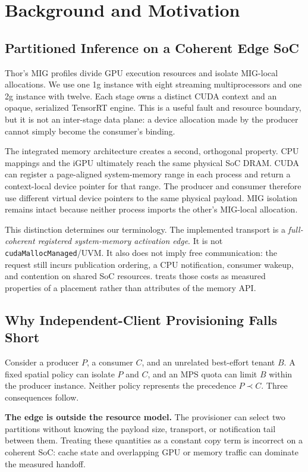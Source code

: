 \section{Background and Motivation}
\label{sec:background}

\subsection{Partitioned Inference on a Coherent Edge SoC}

Thor's MIG profiles divide GPU execution resources and isolate MIG-local
allocations.  We use one 1g instance with eight streaming multiprocessors and
one 2g instance with twelve.  Each stage owns a distinct CUDA context and an
opaque, serialized TensorRT engine.  This is a useful fault and resource
boundary, but it is not an inter-stage data plane: a device allocation made by
the producer cannot simply become the consumer's binding.

The integrated memory architecture creates a second, orthogonal property.
CPU mappings and the iGPU ultimately reach the same physical SoC DRAM.  CUDA
can register a page-aligned system-memory range in each process and return a
context-local device pointer for that range.  The producer and consumer
therefore use different virtual device pointers to the same physical payload.
MIG isolation remains intact because neither process imports the other's
MIG-local allocation.

This distinction determines our terminology.  The implemented transport is a
\emph{full-coherent registered system-memory activation edge}.  It is not
\texttt{cudaMallocManaged}/UVM.  It also does not imply free communication:
the request still incurs publication ordering, a CPU notification, consumer
wakeup, and contention on shared SoC resources.  \sys treats those costs as
measured properties of a placement rather than attributes of the memory API.

\subsection{Why Independent-Client Provisioning Falls Short}

Consider a producer $P$, a consumer $C$, and an unrelated best-effort tenant
$B$.  A fixed spatial policy can isolate $P$ and $C$, and an MPS quota can
limit $B$ within the producer instance.  Neither policy represents the
precedence $P\prec C$.  Three consequences follow.

\textbf{The edge is outside the resource model.}
The provisioner can select two partitions without knowing the payload size,
transport, or notification tail between them.  Treating these quantities as a
constant copy term is incorrect on a coherent SoC: cache state and overlapping
GPU or memory traffic can dominate the measured handoff.

